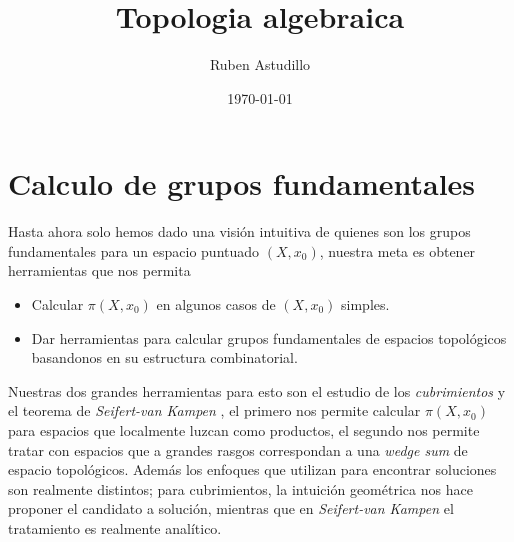 \documentclass[letterpaper]{article}
\newcommand{\vank}{\emph{Seifert-van Kampen} }
\theoremstyle{definition}
\theoremstyle{plain}
\theoremstyle{plain}
\theoremstyle{plain}
\theoremstyle{plain}
\theoremstyle{remark}
\theoremstyle{remark}
\begin{document}
\title{Topologia algebraica}
\author{Ruben Astudillo}
\date{\today}
\maketitle


\tableofcontents



\section{Calculo de grupos fundamentales}
Hasta ahora solo hemos dado una visión intuitiva de quienes son los
grupos fundamentales para un espacio puntuado \((X,x_0)\), nuestra meta
es obtener herramientas que nos permita
\begin{itemize}
\item Calcular \(\pi (X, x_0)\) en algunos casos de \((X,x_0)\) simples.
\item Dar herramientas para calcular grupos fundamentales de espacios
  topológicos basandonos en su estructura combinatorial.
\end{itemize}
Nuestras dos grandes herramientas para esto son el estudio de los
\emph{cubrimientos} y el teorema de \vank , el primero nos permite
calcular \(\pi (X, x_0)\) para espacios que localmente luzcan como
productos, el segundo nos permite tratar con espacios que a grandes
rasgos correspondan a una \emph{wedge sum} de espacio topológicos.
Además los enfoques que utilizan para encontrar soluciones son realmente
distintos; para cubrimientos, la intuición geométrica nos hace
proponer el candidato a solución, mientras que en \vank el tratamiento
es realmente analítico.



\end{document}
